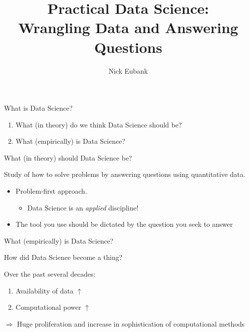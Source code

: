 \documentclass[11pt]{beamer}
\title{Practical Data Science: \\ Wrangling Data and Answering Questions}
\author{\small Nick Eubank}
\date{\vspace*{.3in} \date}
\begin{document}
\begin{frame}
\maketitle
\end{frame}


\begin{frame}[c]{What is Data Science?}
\begin{enumerate}
	\pause \item What (\alert{in theory}) do we think Data Science should be?
	\pause \item What (\alert{empirically}) is Data Science?
\end{enumerate}
\end{frame}



\begin{frame}[c]{What (in theory) should Data Science be?}

\pause Study of how to \alert{solve problems} \pause by \alert{answering questions} \pause using \alert{quantitative data.}

\pause
\begin{itemize}
	\item Problem-first approach. 
	\begin{itemize}
		\pause \item Data Science is an \emph{applied} discipline!
	\end{itemize} 
	\pause \item The tool you use should be dictated by the question you seek to answer
\end{itemize}

\end{frame}

\begin{frame}[c]{What (empirically) is Data Science?}

\end{frame}

\begin{frame}[c]{How did Data Science become a thing?}

Over the past several decades:
\begin{enumerate}
	\item Availability of data $\uparrow$
	\item Computational power $\uparrow$
\end{enumerate}
\pause
$\Rightarrow$ Huge proliferation and increase in sophistication of computational methods
\end{frame}
\end{document}
